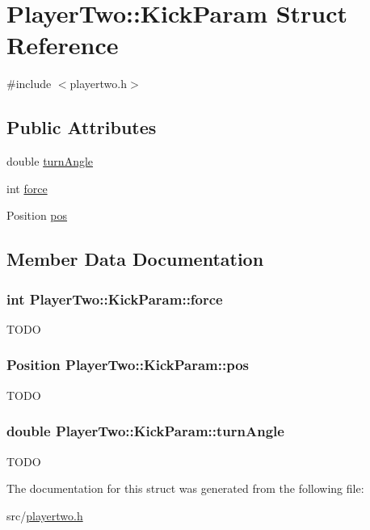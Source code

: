 \hypertarget{structPlayerTwo_1_1KickParam}{
\section{PlayerTwo::KickParam Struct Reference}
\label{structPlayerTwo_1_1KickParam}
}


{\ttfamily \#include $<$playertwo.h$>$}

\subsection*{Public Attributes}
\begin{DoxyCompactItemize}
\item 
double \hyperlink{structPlayerTwo_1_1KickParam_a9f6966583c1546ba873b2ccd4c004765}{turnAngle}
\item 
int \hyperlink{structPlayerTwo_1_1KickParam_a556489a5a486628f52c33e3788655c49}{force}
\item 
Position \hyperlink{structPlayerTwo_1_1KickParam_a66b0456e842c959443ba5eb2df7221b4}{pos}
\end{DoxyCompactItemize}


\subsection{Member Data Documentation}
\hypertarget{structPlayerTwo_1_1KickParam_a556489a5a486628f52c33e3788655c49}{
\subsubsection[{force}]{\setlength{\rightskip}{0pt plus 5cm}int {\bf PlayerTwo::KickParam::force}}}
\label{structPlayerTwo_1_1KickParam_a556489a5a486628f52c33e3788655c49}
TODO \hypertarget{structPlayerTwo_1_1KickParam_a66b0456e842c959443ba5eb2df7221b4}{
\subsubsection[{pos}]{\setlength{\rightskip}{0pt plus 5cm}Position {\bf PlayerTwo::KickParam::pos}}}
\label{structPlayerTwo_1_1KickParam_a66b0456e842c959443ba5eb2df7221b4}
TODO \hypertarget{structPlayerTwo_1_1KickParam_a9f6966583c1546ba873b2ccd4c004765}{
\subsubsection[{turnAngle}]{\setlength{\rightskip}{0pt plus 5cm}double {\bf PlayerTwo::KickParam::turnAngle}}}
\label{structPlayerTwo_1_1KickParam_a9f6966583c1546ba873b2ccd4c004765}
TODO 

The documentation for this struct was generated from the following file:\begin{DoxyCompactItemize}
\item 
src/\hyperlink{playertwo_8h}{playertwo.h}\end{DoxyCompactItemize}
